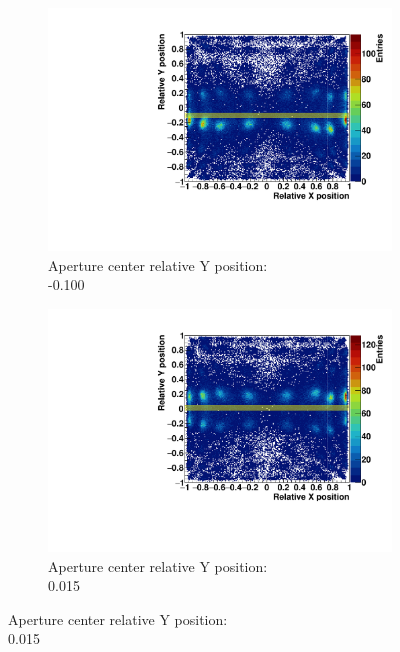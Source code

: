 \begin{figure}
\begin{subfigure}[t]{0.5\textwidth}
\centering
\includegraphics[width=\textwidth]{03_GraphicFiles/chapter3_CLaRySproto/Absorber/images_scan/line_2mm_vert/run12_floodMap.pdf}
\caption{Aperture center relative Y position: \\ -0.100}
\label{chap3::fig::scan_map1_vert}
\end{subfigure}
\begin{subfigure}[t]{0.5\textwidth}
\centering
\includegraphics[width=\textwidth]{03_GraphicFiles/chapter3_CLaRySproto/Absorber/images_scan/line_2mm_vert/run13_floodMap.pdf}
\caption{Aperture center relative Y position: \\ 0.015}
\label{chap3::fig::scan_map2_vert}
\end{subfigure}\newline

\end{figure}
